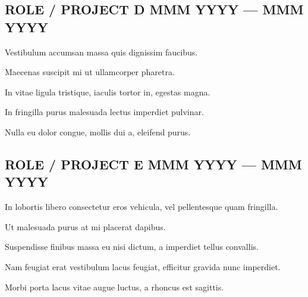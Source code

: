 \subsection{{ROLE / PROJECT D \hfill MMM YYYY --- MMM YYYY}}
\begin{zitemize}
\item Vestibulum accumsan massa quis dignissim faucibus.
\item Maecenas suscipit mi ut ullamcorper pharetra.
\item In vitae ligula tristique, iaculis tortor in, egestas magna.
\item In fringilla purus malesuada lectus imperdiet pulvinar.
\item Nulla eu dolor congue, mollis dui a, eleifend purus.
\end{zitemize}

\subsection{{ROLE / PROJECT E \hfill MMM YYYY --- MMM YYYY}}
\begin{zitemize}
\item In lobortis libero consectetur eros vehicula, vel pellentesque quam fringilla.
\item Ut malesuada purus at mi placerat dapibus.
\item Suspendisse finibus massa eu nisi dictum, a imperdiet tellus convallis.
\item Nam feugiat erat vestibulum lacus feugiat, efficitur gravida nunc imperdiet.
\item Morbi porta lacus vitae augue luctus, a rhoncus est sagittis.
\end{zitemize}
